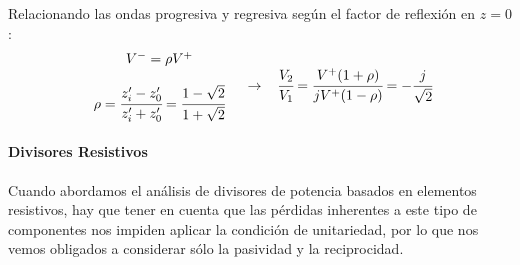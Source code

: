 \documentclass[12pt]{article}
\begin{document}
Relacionando las ondas progresiva y regresiva seg\'un el factor de reflexi\'on en $z = 0$:
$$\begin{array}{c}
	V^- = \rho V^+ \\
	\\
	\rho = \cfrac{z_i' - z_0'}{z_i' + z_0'} = \cfrac{1-\sqrt{2}}{1+\sqrt{2}}
\end{array}
\hspace{3mm}\rightarrow\hspace{3mm}
\cfrac{V_2}{V_1} = \cfrac{V^+ (1+\rho)}{jV^+(1-\rho)} = -\cfrac{j}{\sqrt{2}}$$


\paragraph{Divisores Resistivos}

Cuando abordamos el an\'alisis de divisores de potencia basados en elementos resistivos, hay que tener en cuenta que las p\'erdidas inherentes a este tipo de componentes nos impiden aplicar la condici\'on de unitariedad, por lo que nos vemos obligados a considerar s\'olo la pasividad y la reciprocidad.
\end{document}
